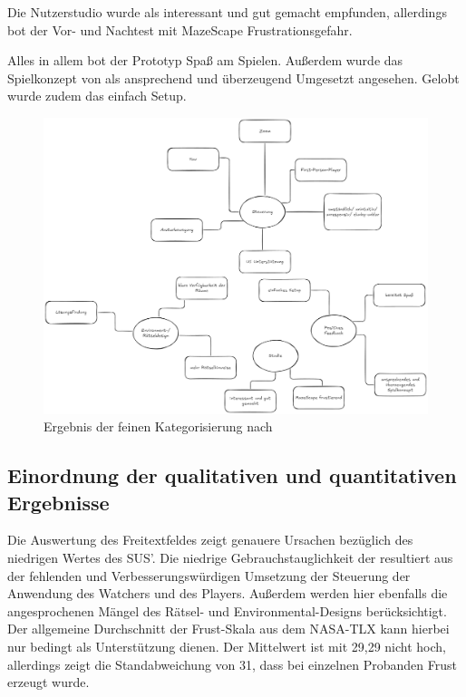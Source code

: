 Die Nutzerstudio wurde als interessant und gut gemacht empfunden, allerdings bot der Vor- und Nachtest mit MazeScape Frustrationsgefahr.

Alles in allem bot der Prototyp Spaß am Spielen. Außerdem wurde das Spielkonzept von  als ansprechend und überzeugend Umgesetzt angesehen. Gelobt wurde zudem das einfach Setup.
\begin{figure}[ht]
\centering
\includegraphics[width=1\linewidth]{content/pictures/Qualitative-Auswertung-Schritt-2.png}
\caption{Ergebnis der feinen Kategorisierung nach \cite{braun_using_2006}}
\label{fig:qualitative-results-end}
\end{figure}


\subsection{Einordnung der qualitativen und quantitativen Ergebnisse}
Die Auswertung des Freitextfeldes zeigt genauere Ursachen bezüglich des niedrigen Wertes des \ac{SUS}'. Die niedrige Gebrauchstauglichkeit der  resultiert aus der fehlenden  und Verbesserungswürdigen Umsetzung der Steuerung der Anwendung des Watchers und des Players. Außerdem werden hier ebenfalls die angesprochenen Mängel des Rätsel- und Environmental-Designs berücksichtigt. Der allgemeine Durchschnitt der Frust-Skala aus dem \ac{NASA-TLX} kann hierbei nur bedingt als Unterstützung dienen. Der Mittelwert ist mit 29,29 nicht hoch, allerdings zeigt die Standabweichung von 31, dass bei einzelnen Probanden Frust erzeugt wurde. 

